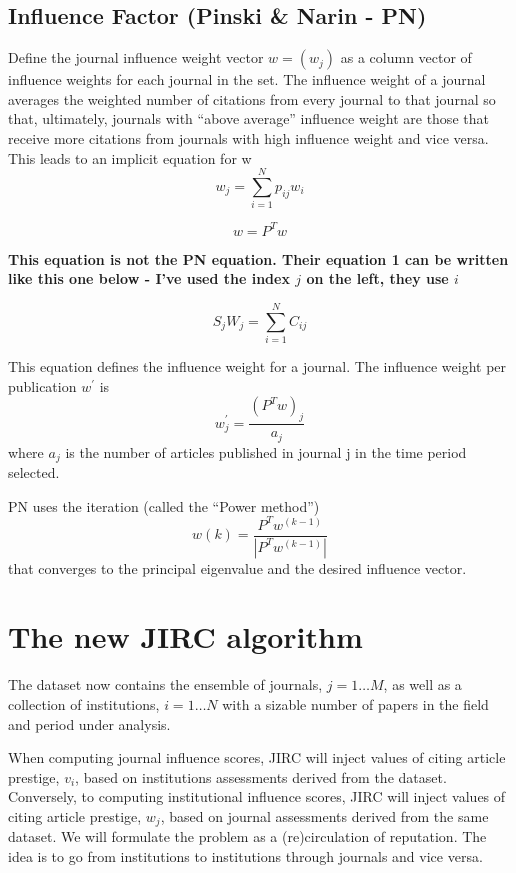 \documentclass[10pt]{article}
\begin{document}
\subsection{Influence Factor (Pinski \& Narin - PN)}
Define the journal influence weight vector
$w = (w_j)$ as a column vector of influence weights for each journal in the set. The influence
weight of a journal averages the weighted number of citations from every journal to that
journal so that, ultimately, journals with ``above average'' influence weight are those that
receive more citations from journals with high influence weight and vice versa. This
leads to an implicit equation for w
\begin{equation}
w_j =   \sum_{i=1}^{N}p_{ij}w_i
\end{equation}

\begin{equation}
w = P^Tw
\end{equation}

\textbf{This equation is not the PN equation. Their equation 1 can be written like this one below - I've used the index $j$ on the left, they use $i$}

\begin{equation}
S_j W_j = \sum_{i=1}^{N}C_{ij}
\end{equation}



This equation defines the influence weight for a journal. The influence weight per
publication $w^{\prime}$ is
\begin{equation}
w^{\prime}_j =
\frac{(P^Tw)_j}{a_{j}}
\end{equation}
where $a_j$ is the number of articles published in journal j in the time period
selected.

\noindent PN uses the iteration (called the “Power method”)
\begin{equation}
w(k)=\frac{P^Tw^{(k-1)}}{|P^Tw^{(k-1)}|}
\end{equation}
that converges to the principal eigenvalue and the desired influence vector.

\section{ The new JIRC algorithm}
 The dataset now contains the ensemble of journals,
 $j=1\ldots M$, as well as a collection of institutions, $i=1\ldots N$ with a sizable number of papers  in the field and period under analysis.

When computing journal influence scores, JIRC will inject  values of citing article prestige, $v_i$, based on institutions assessments derived from the  dataset. Conversely, to
 computing institutional influence scores, JIRC will inject  values of citing article prestige, $w_j$, based on journal assessments derived from the same dataset.
We will formulate the problem as a (re)circulation of reputation. The idea is to go from institutions to institutions through journals and vice versa.
\end{document}

